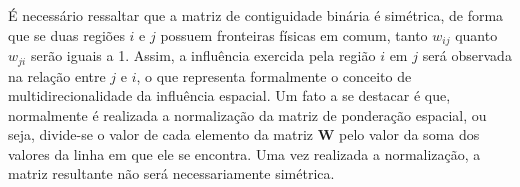 \documentclass[
	12pt,				%
	openright,			%
	oneside,			%
	a4paper,			%
	chapter=TITLE,		%
	section=TITLE,		%
	english,			%
	french,				%
	spanish,			%
	brazil				%
	]{abntex2}
\begin{document}



É necessário ressaltar que a matriz de contiguidade binária é simétrica, de forma que se duas regiões $i$ e $j$ possuem fronteiras físicas em comum, tanto $w_{ij}$ quanto $w_{ji}$ serão iguais a 1. Assim, a influência exercida pela região $i$ em $j$ será observada na relação entre $j$ e $i$, o que representa formalmente o conceito de multidirecionalidade da influência espacial. Um fato a se destacar é que, normalmente é realizada a normalização da matriz de ponderação espacial, ou seja, divide-se o valor de cada elemento da matriz $\boldsymbol{W}$ pelo valor da soma dos valores da linha em que ele se encontra. Uma vez realizada a normalização, a matriz resultante não será  necessariamente simétrica. 


\end{document}
